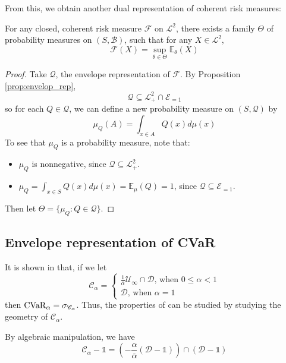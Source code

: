 From this, we obtain another dual representation of coherent risk measures:
\begin{prop}
	\label{prop:dual_crm}
	For any closed, coherent risk measure $\mathcal{F}$ on $\mathscr{L}^2$, there exists a family $\Theta$ of probability measures on $(S, \mathcal{B})$, such that for any $X \in \mathscr{L}^2$, 
	\begin{equation}
		\label{eq:dual_crm}
		\mathcal{F}(X) = \sup_{\theta\in\Theta}\mathbb{E}_{\theta}(X)
	\end{equation}
\end{prop}
\begin{proof}
	Take $\mathscr{Q}$, the envelope representation of $\mathcal{F}$. By Proposition \ref{prop:envelop_rep},
	$$\mathscr{Q}\subseteq \mathscr{L}_+^2\cap \mathscr{E}_{=1}$$
	so for each $Q\in\mathscr{Q}$, we can define a new probability measure on $(S, \mathcal{Q})$ by
	$$\mu_Q (A) = \int_{x\in A}Q(x)d\mu(x)$$
	To see that $\mu_Q$ is a probability measure, note that:\begin{itemize}
	\item $\mu_Q$ is nonnegative, since $\mathscr{Q}\subseteq \mathscr{L}_+^2$.
	
	\item $\mu_Q = \int_{x\in S}Q(x)d\mu(x) = \mathbb{E}_\mu(Q)= 1$, since $\mathscr{Q}\subseteq\mathscr{E}_{=1}$.
	\end{itemize}
	Then let $\Theta = \{\mu_Q : Q \in\mathscr{Q}\}$.
\end{proof}

\subsection{Envelope representation of CVaR}

It is shown in \cite[Section 5.8]{williamsonFairnessRiskMeasures2019} that, if we let 
\begin{equation}\label{eq:env_cvar}
\mathscr{C}_\alpha = \begin{cases}
\frac{1}{\overbar{\alpha}}\mathscr{U}_\infty \cap \mathscr{D} \text{, when } 0 \le \alpha < 1\\
\mathscr{D} \text{, when }\alpha= 1
\end{cases}
\end{equation}
then \(\text{\ensuremath{\operatorname{CVaR}}}_\alpha = \sigma_{\mathscr{C}_\alpha}\). Thus, the properties of \cvar can be studied by studying the geometry of \(\mathscr{C}_\alpha\). 

By algebraic manipulation, we have
\begin{equation}
\mathscr{C}_\alpha - \mathds{1} = \left(-\frac{\alpha}{{\overbar{\alpha}}}(\mathscr{D} - \mathds{1})\right) \cap (\mathscr{D} - \mathds{1} )
\label{eq:cvar_homothety}
\end{equation}

